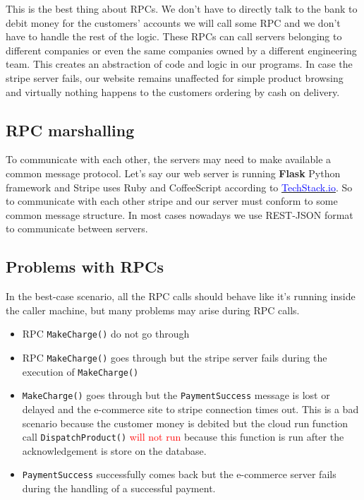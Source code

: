 \noindent This is the best thing about RPCs. We don't have to directly talk to the bank to debit money for the customers' accounts we will call some RPC and we don't have to handle the rest of the logic. These RPCs can call servers belonging to different companies or even the same companies owned by a different engineering team. This creates an abstraction of code and logic in our programs. In case the stripe server fails, our website remains unaffected for simple product browsing and virtually nothing happens to the customers ordering by cash on delivery.

\subsection{RPC marshalling}
\noindent To communicate with each other, the servers may need to make available a common message protocol. Let's say our web server is running \textbf{Flask} Python framework and Stripe uses Ruby and CoffeeScript according to \href{https://techstacks.io/stacks/stripe}{\textcolor{blue}{TechStack.io}}. So to communicate with each other stripe and our server must conform to some common message structure. In most cases nowadays we use REST-JSON format to communicate between servers.

\subsection{Problems with RPCs}
In the best-case scenario, all the RPC calls should behave like it's running inside the caller machine, but many problems may arise during RPC calls.

\begin{itemize}
    \item RPC \texttt{MakeCharge()} do not go through
    \item RPC \texttt{MakeCharge()} goes through but the stripe server fails during the execution of \texttt{MakeCharge()}
    \item \texttt{MakeCharge()} goes through but the \texttt{PaymentSuccess} message is lost or delayed and the e-commerce site to stripe connection times out. This is a bad scenario because the customer money is debited but the cloud run function call \texttt{DispatchProduct()} \textcolor{red}{will not run} because this function is run after the acknowledgement is store on the database.
    \item \texttt{PaymentSuccess} successfully comes back but the e-commerce server fails during the handling of a successful payment.
\end{itemize}

